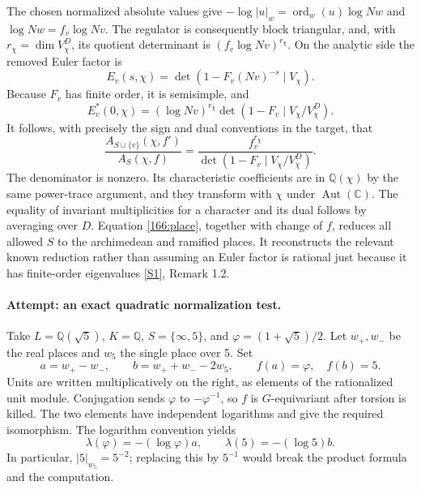 \documentclass[11pt,a4paper]{article}
\newcommand{\Q}{\mathbb{Q}}
\newcommand{\C}{\mathbb{C}}
\newcommand{\sref}[2]{\hyperlink{source:#1:#2}{[S#2]}}
\numberwithin{equation}{section}
\begin{document}
The chosen normalized absolute values give
$-\log|u|_w=\operatorname{ord}_w(u)\log Nw$ and
$\log Nw=f_v\log Nv$. The regulator is consequently block triangular,
and, with $r_\chi=\dim V_\chi^D$, its quotient determinant is
$(f_v\log Nv)^{r_\chi}$. On the analytic side the removed Euler factor is
\begin{equation}
 E_v(s,\chi)=\det(1-F_v(Nv)^{-s}\mid V_\chi).
\end{equation}
Because $F_v$ has finite order, it is semisimple, and
\begin{equation}
 E_v^*(0,\chi)=(\log Nv)^{r_\chi}
  \det(1-F_v\mid V_\chi/V_\chi^D).
\end{equation}
It follows, with precisely the sign and dual conventions in the target,
that
\begin{equation}\label{166:place}
 \frac{A_{S\cup\{v\}}(\chi,f')}{A_S(\chi,f)}
 =\frac{f_v^{r_\chi}}
 {\det(1-F_v\mid V_\chi/V_\chi^D)}.
\end{equation}
The denominator is nonzero. Its characteristic coefficients are in
$\Q(\chi)$ by the same power-trace argument, and they transform with
$\chi$ under $\operatorname{Aut}(\C)$. The equality of invariant
multiplicities for a character and its dual follows by averaging over
$D$. Equation \eqref{166:place}, together with change of $f$, reduces
all allowed $S$ to the archimedean and ramified places. It reconstructs
the relevant known reduction rather than assuming an Euler factor is
rational just because it has finite-order eigenvalues
\sref{166}{1}, Remark 1.2.

\paragraph{Attempt: an exact quadratic normalization test.}
Take $L=\Q(\sqrt5)$, $K=\Q$, $S=\{\infty,5\}$, and
$\varphi=(1+\sqrt5)/2$. Let $w_+,w_-$ be the real places and $w_5$ the
single place over 5. Set
\begin{equation}
 a=w_+-w_-,\qquad b=w_++w_--2w_5,
 \qquad f(a)=\varphi,\quad f(b)=5.
\end{equation}
Units are written multiplicatively on the right, as elements of the
rationalized unit module. Conjugation sends $\varphi$ to
$-\varphi^{-1}$, so $f$ is $G$-equivariant after torsion is killed.
The two elements have independent logarithms and give the required
isomorphism. The logarithm convention yields
\begin{equation}
 \lambda(\varphi)=-(\log\varphi)a,\qquad
 \lambda(5)=-(\log5)b.
\end{equation}
In particular, $|5|_{w_5}=5^{-2}$; replacing this by $5^{-1}$ would
break the product formula and the computation.
\end{document}

